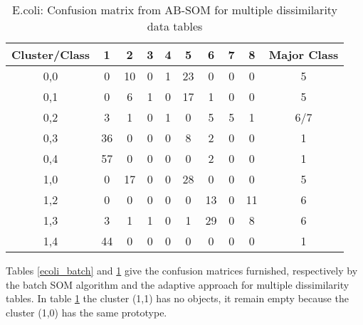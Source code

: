 \documentclass[10pt, conference, compsocconf]{IEEEtran}
\begin{document}
\begin{table}[!h]
\renewcommand{\arraystretch}{1.2}
\begin{center}
\caption{E.coli: Confusion matrix from AB-SOM for multiple dissimilarity data tables}
\begin{tabular}{|c|c|c|c|c|c|c|c|c||c|}
\hline
Cluster/Class & 1 & 2 & 3 & 4 & 5 & 6 & 7 & 8 & Major Class\\ \hline
0,0 & 0 & 10 & 0 & 1 & 23 & 0 & 0 & 0 & 5\\ \hline
0,1 & 0 & 6 & 1 & 0 & 17 & 1 & 0 & 0 & 5\\ \hline
0,2 & 3 & 1 & 0 & 1 & 0 & 5 & 5 & 1 & 6/7\\ \hline
0,3 & 36 & 0 & 0 & 0 & 8 & 2 & 0 & 0 & 1\\ \hline
0,4 & 57 & 0 & 0 & 0 & 0 & 2 & 0 & 0 & 1\\ \hline \hline
1,0 & 0 & 17 & 0 & 0 & 28 & 0 & 0 & 0 & 5\\ \hline
1,2 & 0 & 0 & 0 & 0 & 0 & 13 & 0 & 11 & 6\\ \hline
1,3 & 3 & 1 & 1 & 0 & 1 & 29 & 0 & 8 & 6\\ \hline
1,4 & 44 & 0 & 0 & 0 & 0 & 0 & 0 & 0 & 1\\ \hline

\end{tabular}
\label{ecoli_adaptativo}
\end{center}
\end{table}

Tables \ref{ecoli_batch} and \ref{ecoli_adaptativo} give the confusion matrices furnished, respectively by the batch SOM algorithm and the adaptive approach for multiple dissimilarity tables. In table \ref{ecoli_adaptativo} the cluster (1,1) has no objects, it remain empty because the cluster (1,0) has the same prototype.
\end{document}
